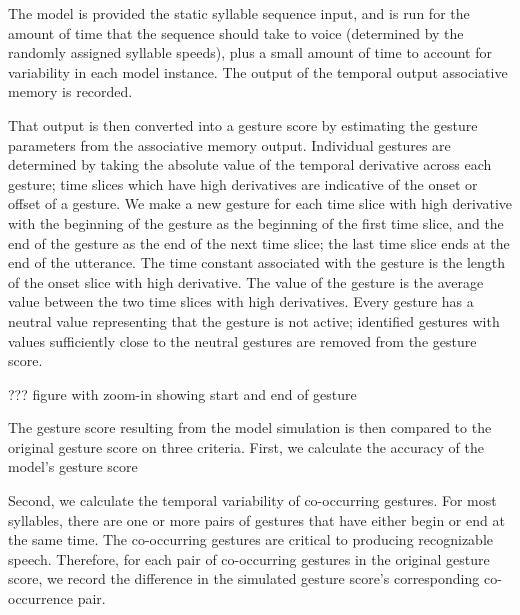 The model is provided the static syllable sequence input,
and is run for the amount of time that the sequence
should take to voice (determined by the
randomly assigned syllable speeds),
plus a small amount of time to account
for variability in each model instance.
The output of the temporal output associative memory
is recorded.

That output is then converted into a gesture score
by estimating the gesture parameters
from the associative memory output.
Individual gestures are determined by
taking the absolute value of the temporal derivative
across each gesture;
time slices which have high derivatives
are indicative of the onset or offset of a gesture.
We make a new gesture for each
time slice with high derivative
with the beginning of the gesture as
the beginning of the first time slice,
and the end of the gesture
as the end of the next time slice;
the last time slice ends at the end
of the utterance.
The time constant associated
with the gesture
is the length of
the onset slice with high derivative.
The value of the gesture is the
average value between the two
time slices with high derivatives.
Every gesture has a neutral value
representing that the gesture
is not active;
identified gestures with values
sufficiently close to the neutral gestures
are removed from the gesture score.

??? figure with zoom-in showing start and end of gesture

The gesture score resulting from the model simulation
is then compared to the original gesture score
on three criteria.
First, we calculate the accuracy
of the model's gesture score



Second, we calculate the temporal variability
of co-occurring gestures.
For most syllables,
there are one or more pairs of gestures
that have either begin or end
at the same time.
The co-occurring gestures
are critical to producing
recognizable speech.
Therefore, for each pair
of co-occurring gestures in the
original gesture score,
we record the difference
in the simulated gesture score's
corresponding co-occurrence pair.

